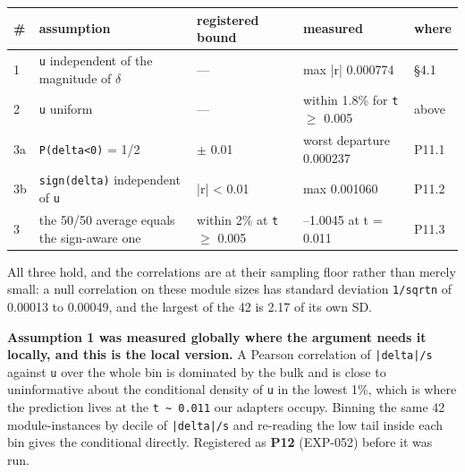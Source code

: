\begin{table}[t]
\centering\footnotesize
\begin{tabularx}{\textwidth}{l>{\hsize=1.418\hsize\raggedright\arraybackslash}X>{\hsize=0.725\hsize\raggedright\arraybackslash}X>{\hsize=0.857\hsize\raggedright\arraybackslash}Xl}
\toprule
\# & assumption & registered bound & measured & where \\
\midrule
1 & \texttt{u} independent of the magnitude of $\delta$ & --- & max |r| 0.000774 & \S{}4.1 \\
2 & \texttt{u} uniform & --- & within 1.8\% for \texttt{t} $\geq$ 0.005 & above \\
3a & \texttt{P(delta<0)} = 1/2 & 0.5 $\pm$ 0.01 & worst departure 0.000237 & P11.1 \\
3b & \texttt{sign(delta)} independent of \texttt{u} & |r| < 0.01 & max 0.001060 & P11.2 \\
3 & the 50/50 average equals the sign-aware one & within 2\% at \texttt{t} $\geq$ 0.005 & 0.9936--1.0045 at t = 0.011 & P11.3 \\
\bottomrule
\end{tabularx}
\end{table}

All three hold, and the correlations are at their sampling floor rather than merely small: a null correlation on these module sizes has standard deviation \texttt{1/\allowbreak{}sqrtn} of 0.00013 to 0.00049, and the largest of the 42 is 2.17 of its own SD.

\textbf{Assumption 1 was measured globally where the argument needs it locally, and this is the local version.} A Pearson correlation of \texttt{|delta|/\allowbreak{}s} against \texttt{u} over the whole bin is dominated by the bulk and is close to uninformative about the conditional density of \texttt{u} in the lowest 1\%, which is where the prediction lives at the \texttt{t \textasciitilde{} 0.\allowbreak{}011} our adapters occupy. Binning the same 42 module-instances by decile of \texttt{|delta|/\allowbreak{}s} and re-reading the low tail inside each bin gives the conditional directly. Registered as \textbf{P12} (EXP-052) before it was run.

